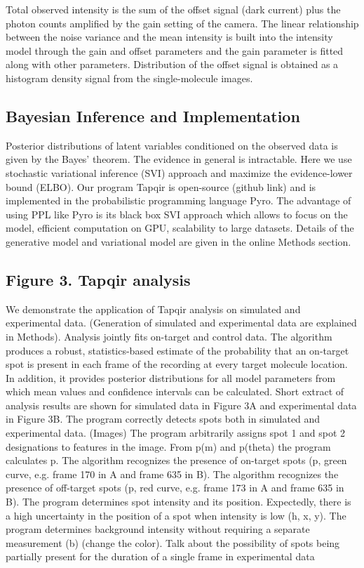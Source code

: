 Total observed intensity is the sum of the offset signal (dark current) plus the photon counts amplified by the gain setting of the camera. The linear relationship between the noise variance and the mean intensity is built into the intensity model through the gain and offset parameters and the gain parameter is fitted along with other parameters. Distribution of the offset signal is obtained as a histogram density signal from the single-molecule images.

\subsection{Bayesian Inference and Implementation}

Posterior distributions of latent variables conditioned on the observed data is given by the Bayes' theorem. The evidence in general is intractable. Here we use stochastic variational inference (SVI) approach and maximize the evidence-lower bound (ELBO). Our program Tapqir is open-source (github link) and is implemented in the probabilistic programming language Pyro. The advantage of using PPL like Pyro is its black box SVI approach which allows to focus on the model, efficient computation on GPU, scalability to large datasets. Details of the generative model and variational model are given in the online Methods section.

\subsection{Figure 3. Tapqir analysis}

We demonstrate the application of Tapqir analysis on simulated and experimental data. (Generation of simulated and experimental data are explained in Methods). Analysis jointly fits on-target and control data. The algorithm produces a robust, statistics-based estimate of the probability that an on-target spot is present in each frame of the recording at every target molecule location. In addition, it provides posterior distributions for all model parameters from which mean values and confidence intervals can be calculated. Short extract of analysis results are shown for simulated data in Figure 3A and experimental data in Figure 3B. The program correctly detects spots both in simulated and experimental data. (Images) The program arbitrarily assigns spot 1 and spot 2 designations to features in the image. From p(m) and p(theta) the program calculates p. The algorithm recognizes the presence of on-target spots (p, green curve, e.g. frame 170 in A and frame 635 in B). The algorithm recognizes the presence of off-target spots (p, red curve, e.g. frame 173 in A and frame 635 in B). The program determines spot intensity and its position. Expectedly, there is a high uncertainty in the position of a spot when intensity is low (h, x, y). The program determines background intensity without requiring a separate measurement (b) (change the color). Talk about the possibility of spots being partially present for the duration of a single frame in experimental data


